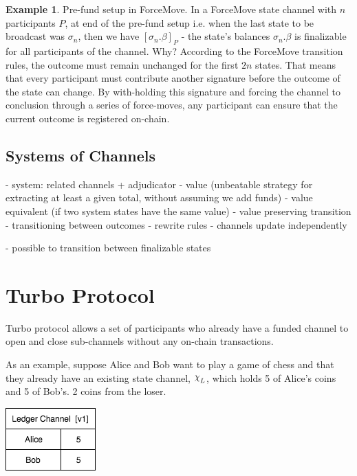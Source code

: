 \documentclass{article}
\DeclareRobustCommand{\rchi}{{\mathpalette\irchi\relax}}
\newcommand{\irchi}[2]{\raisebox{\depth}{$#1\chi$}} %
\theoremstyle{definition}
\newtheorem{example}{Example}[section]
\newcommand{\enf}[1]{[#1]}
\begin{document}
\begin{example}{Pre-fund setup in ForceMove.}
  In a ForceMove state channel with $n$ participants $P$, at end of the pre-fund setup i.e.
  when the last state to be broadcast was $\sigma_n$, then we have $\enf{\sigma_n.\beta}_P$ -
  the state's balances $\sigma_n.\beta$ is finalizable for all participants of the channel.
  Why? According to the ForceMove transition rules, the outcome must remain unchanged for the
  first $2n$ states. That means that every participant must contribute another signature before
  the outcome of the state can change. By with-holding this signature and forcing the channel to
  conclusion through a series of force-moves, any participant can ensure that the current
  outcome is registered on-chain.
\end{example}

\subsection{Systems of Channels}

- system: related channels + adjudicator
- value (unbeatable strategy for extracting at least a given total, without assuming we add funds)
- value equivalent (if two system states have the same value)
- value preserving transition
- transitioning between outcomes
- rewrite rules
- channels update independently

- possible to transition between finalizable states

\section{Turbo Protocol}

Turbo protocol allows a set of participants who already have a funded channel to open and
close sub-channels without any on-chain transactions. 

As an example, suppose Alice and Bob want to play a game of chess and that
they already have an existing state channel, $\rchi_L$, which holds
5 of Alice's coins and 5 of Bob's.
2 coins from the loser.

\begin{center}
  \includegraphics[scale=0.5]{turbo_start} %
\end{center}
\end{document}
